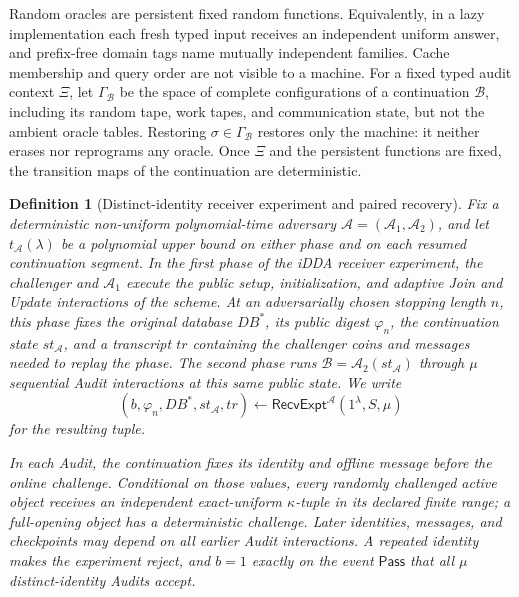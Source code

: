 \documentclass[11pt]{article}
\newtheorem{definition}[lemma]{Definition}
\begin{document}
Random oracles are persistent fixed random functions.  Equivalently, in a
lazy implementation each fresh typed input receives an independent uniform
answer, and prefix-free domain tags name mutually independent families.
Cache membership and query order are not visible to a machine.  For a fixed
typed audit context $\Xi$, let $\Gamma_{\mathcal B}$ be the space of complete
configurations of a continuation $\mathcal B$, including its random tape,
work tapes, and communication state, but not the ambient oracle tables.
Restoring $\sigma\in\Gamma_{\mathcal B}$ restores only the machine: it neither
erases nor reprograms any oracle.  Once $\Xi$ and the persistent functions are
fixed, the transition maps of the continuation are deterministic.

\begin{definition}[Distinct-identity receiver experiment and paired recovery]
\label{def:receiver-experiment}
Fix a deterministic non-uniform polynomial-time adversary
$\mathcal A=(\mathcal A_1,\mathcal A_2)$, and let
$t_{\mathcal A}(\lambda)$ be a polynomial upper bound on either phase and on
each resumed continuation segment.  In the first phase of the iDDA receiver
experiment, the challenger and $\mathcal A_1$ execute the public setup,
initialization, and adaptive Join and Update interactions of the scheme.  At
an adversarially chosen stopping length $n$, this phase fixes the original
database $\mathit{DB}^{*}$, its public digest $\varphi_n$, the continuation
state $\mathit{st}_{\mathcal A}$, and a transcript $\mathit{tr}$ containing
the challenger coins and messages needed to replay the phase.  The second
phase runs
$\mathcal B=\mathcal A_2(\mathit{st}_{\mathcal A})$ through $\mu$ sequential
Audit interactions at this same public state.  We write
\[
 (b,\varphi_n,\mathit{DB}^{*},\mathit{st}_{\mathcal A},\mathit{tr})
 \leftarrow
 \mathsf{RecvExpt}^{\mathcal A}(1^\lambda,S,\mu)
\]
for the resulting tuple.

In each Audit, the continuation fixes its identity and offline message before
the online challenge.  Conditional on those values, every randomly challenged
active object receives an independent exact-uniform $\kappa$-tuple in its
declared finite range; a full-opening object has a deterministic challenge.
Later identities, messages, and checkpoints may depend on all earlier Audit
interactions.  A repeated identity makes the experiment reject, and $b=1$
exactly on the event $\mathsf{Pass}$ that all $\mu$ distinct-identity Audits
accept.


\end{definition}
\end{document}
